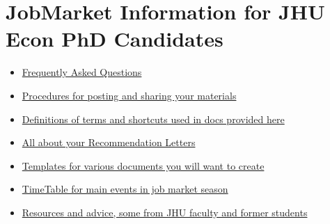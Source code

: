 \documentclass{\classes/econtex}
\begin{document}
\medskip


\section*{JobMarket Information for JHU Econ PhD Candidates}

\begin{itemize}
  \item \href{\pageurl/FAQ}{Frequently Asked Questions}
  \item \href{\bloburl/JobMarketProceduresHelp.md}{Procedures for posting and sharing your materials}
  \item \href{\pageurl/Notation}{Definitions of terms and shortcuts used in docs provided here}
  \item \href{\pageurl/RecLetters}{All about your Recommendation Letters}
  \item \href{\bloburl/Templates}{Templates for various documents you will want to create}
  \item \href{\pageurl/TimeTable}{TimeTable for main events in job market season}
  \item \href{\bloburl/Resources}{Resources and advice, some from JHU faculty and former students}
\end{itemize}
\end{document}
